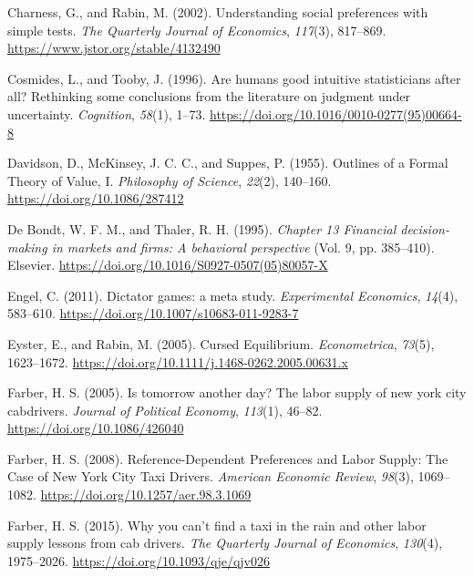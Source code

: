 \documentclass[
  letterpaper,
  DIV=11,
  numbers=noendperiod]{scrreprt}
\newlength{\cslhangindent}
\newlength{\cslentryspacingunit} %
\newenvironment{CSLReferences}[2] %
 {%
  \setlength{\parindent}{0pt}
  \ifodd #1
  \let\oldpar\par
  \def\par{\hangindent=\cslhangindent\oldpar}
  \fi
  \setlength{\parskip}{#2\cslentryspacingunit}
 }%
 {}
\begin{document}
\begin{CSLReferences}{1}{0}
\leavevmode{}%
Charness, G., and Rabin, M. (2002). Understanding social preferences
with simple tests. \emph{The Quarterly Journal of Economics},
\emph{117}(3), 817--869. \url{https://www.jstor.org/stable/4132490}

\leavevmode{}%
Cosmides, L., and Tooby, J. (1996). Are humans good intuitive
statisticians after all? Rethinking some conclusions from the literature
on judgment under uncertainty. \emph{Cognition}, \emph{58}(1), 1--73.
\url{https://doi.org/10.1016/0010-0277(95)00664-8}

\leavevmode{}%
Davidson, D., McKinsey, J. C. C., and Suppes, P. (1955). Outlines of a
Formal Theory of Value, I. \emph{Philosophy of Science}, \emph{22}(2),
140--160. \url{https://doi.org/10.1086/287412}

\leavevmode{}%
De Bondt, W. F. M., and Thaler, R. H. (1995). \emph{Chapter 13 Financial
decision-making in markets and firms: A behavioral perspective} (Vol. 9,
pp. 385--410). Elsevier.
\url{https://doi.org/10.1016/S0927-0507(05)80057-X}

\leavevmode{}%
Engel, C. (2011). Dictator games: a meta study. \emph{Experimental
Economics}, \emph{14}(4), 583--610.
\url{https://doi.org/10.1007/s10683-011-9283-7}

\leavevmode{}%
Eyster, E., and Rabin, M. (2005). Cursed Equilibrium.
\emph{Econometrica}, \emph{73}(5), 1623--1672.
\url{https://doi.org/10.1111/j.1468-0262.2005.00631.x}

\leavevmode{}%
Farber, H. S. (2005). Is tomorrow another day? The labor supply of new
york city cabdrivers. \emph{Journal of Political Economy},
\emph{113}(1), 46--82. \url{https://doi.org/10.1086/426040}

\leavevmode{}%
Farber, H. S. (2008). Reference-Dependent Preferences and Labor Supply:
The Case of New York City Taxi Drivers. \emph{American Economic Review},
\emph{98}(3), 1069--1082. \url{https://doi.org/10.1257/aer.98.3.1069}

\leavevmode{}%
Farber, H. S. (2015). Why you can{'}t find a taxi in the rain and other
labor supply lessons from cab drivers. \emph{The Quarterly Journal of
Economics}, \emph{130}(4), 1975--2026.
\url{https://doi.org/10.1093/qje/qjv026}


\end{CSLReferences}
\end{document}
